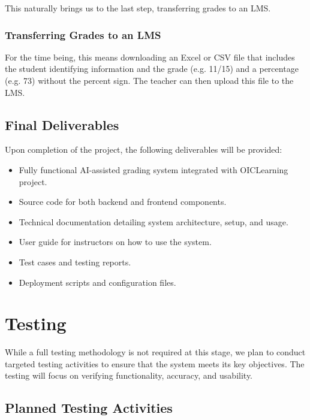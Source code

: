 \documentclass[ms,twoside,print]{nuthesis}
\begin{document}
This naturally brings us to the last step, transferring grades to an LMS.

\subsection{Transferring Grades to an LMS}

For the time being, this means downloading an Excel or CSV file that includes the student identifying information and the grade (e.g. 11/15) and a percentage (e.g. 73) without the percent sign. The teacher can then upload this file to the LMS.

\section{Final Deliverables}

Upon completion of the project, the following deliverables will be provided:

\begin{itemize}
    \item Fully functional AI-assisted grading system integrated with OICLearning project.
    \item Source code for both backend and frontend components.
    \item Technical documentation detailing system architecture, setup, and usage.
    \item User guide for instructors on how to use the system.
    \item Test cases and testing reports.
    \item Deployment scripts and configuration files.
\end{itemize}

\chapter{Testing}

While a full testing methodology is not required at this stage, we plan to conduct targeted testing activities to ensure that the system meets its key objectives. The testing will focus on verifying functionality, accuracy, and usability.

\section{Planned Testing Activities}
\end{document}

